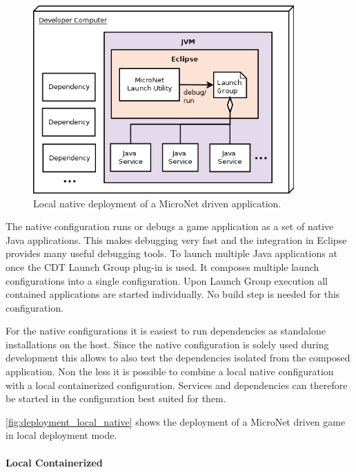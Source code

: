 \begin{figure}
	\centering
	\includegraphics[width=10cm]{images/architecture/DeploymentLocalNative}
	\caption{Local native deployment of a MicroNet driven application.}
	\label{fig:deployment_local_native}
\end{figure}

The native configuration runs or debugs a game application as a set of native
Java applications. This makes debugging very fast and the integration in Eclipse
provides many useful debugging tools. To launch multiple Java applications at
once the CDT Launch Group plug-in is used. It composes multiple launch
configurations into a single configuration. Upon Launch Group execution all
contained applications are started individually. No build step is needed for
this configuration.

For the native configurations it is easiest to run dependencies as standalone
installations on the host. Since the native configuration is solely used during
development this allows to also test the dependencies isolated from the composed
application. Non the less it is possible to combine a local native configuration
with a local containerized configuration. Services and dependencies can
therefore be started in the configuration best suited for them. 

\autoref{fig:deployment_local_native} shows the deployment of a MicroNet
driven game in local deployment mode.

\paragraph{Local Containerized}

